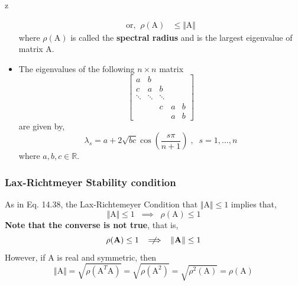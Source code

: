 z\documentclass[a4paper,12pt,twoside]{book}
\newcommand{\mat}[1]{\bm{\mathrm{#1}}}
\newcommand{\norm}[1]{\Vert #1 \Vert}
\begin{document}
\begin{itemize}
{\begin{equation}
\begin{split}
            \text{or,}\;\;\rho(\mat{A}) &\le \norm{\mat{A}}
        \end{split}
    \end{equation}
    where $\rho(\mat{A})$ is called the \textbf{spectral radius} and is the largest eigenvalue of matrix $\mat{A}$.
    }
    \item{The eigenvalues of the following $n\times n$ matrix 
    \begin{equation*}
        \begin{bmatrix}
            a & b &  &  &  \\
            c & a & b &  &  \\
            \ddots & \ddots & \ddots  &  &  \\
             &  &c  & a &b  \\
              &  &  & a & b 
        \end{bmatrix}
    \end{equation*}
    are given by,
    \begin{equation}
        \lambda_s = a+ 2\sqrt{bc}\cos\left( \frac{s\pi}{n+1} \right)\;,\;\;s = 1,\dots,n
    \end{equation}
    where $a,b,c\in \mathbb{R}$.
    }
\end{itemize}
\subsubsection{Lax-Richtmeyer Stability condition}
As in Eq. 14.38, the Lax-Richtemeyer Condition that $\norm{\mat{A}} \le 1$ implies that,
\begin{equation}
\boxed{    \norm{\mat{A}} \le 1 \;\;\implies\;\; \rho(\mat{A}) \le 1}
\end{equation}
\textbf{Note that the converse is not true}, that is, 
\[\rho(\mat{A}) \le 1 \;\;\centernot\implies\;\;\norm{\mat{A}} \le 1\]
However, if $\mat{A}$ is real and symmetric, then
\begin{equation}
\norm{\mat{A}} = \sqrt{\rho(\mat{A}^T\mat{A})} = \sqrt{\rho(\mat{A}^2)} = \sqrt{\rho^2(\mat{A})} = \rho(\mat{A})
\end{equation}
\end{document}
